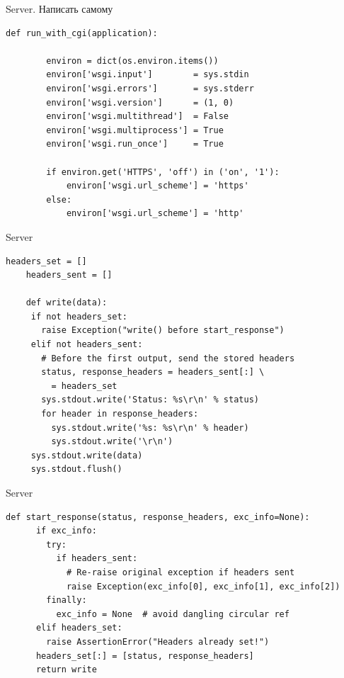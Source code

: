 \begin{frame}[fragile]{Server. Написать самому}

    \begin{lstlisting}[style=python]
    def run_with_cgi(application):

        environ = dict(os.environ.items())
        environ['wsgi.input']        = sys.stdin
        environ['wsgi.errors']       = sys.stderr
        environ['wsgi.version']      = (1, 0)
        environ['wsgi.multithread']  = False
        environ['wsgi.multiprocess'] = True
        environ['wsgi.run_once']     = True

        if environ.get('HTTPS', 'off') in ('on', '1'):
            environ['wsgi.url_scheme'] = 'https'
        else:
            environ['wsgi.url_scheme'] = 'http'
    \end{lstlisting}

\end{frame}

\begin{frame}[fragile]{Server}

    \begin{lstlisting}[style=python]
    headers_set = []
    headers_sent = []

    def write(data):
     if not headers_set:
       raise Exception("write() before start_response")
     elif not headers_sent:
       # Before the first output, send the stored headers
       status, response_headers = headers_sent[:] \
         = headers_set
       sys.stdout.write('Status: %s\r\n' % status)
       for header in response_headers:
         sys.stdout.write('%s: %s\r\n' % header)
         sys.stdout.write('\r\n')
     sys.stdout.write(data)
     sys.stdout.flush()
    \end{lstlisting}

\end{frame}

\begin{frame}[fragile]{Server}

    \begin{lstlisting}[style=python]
    def start_response(status, response_headers, exc_info=None):
      if exc_info:
        try:
          if headers_sent:
            # Re-raise original exception if headers sent
            raise Exception(exc_info[0], exc_info[1], exc_info[2])
        finally:
          exc_info = None  # avoid dangling circular ref
      elif headers_set:
        raise AssertionError("Headers already set!")
      headers_set[:] = [status, response_headers]
      return write
    \end{lstlisting}

\end{frame}

